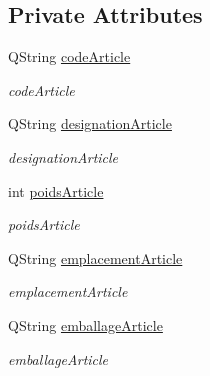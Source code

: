 \subsection*{Private Attributes}
\begin{DoxyCompactItemize}
\item 
\mbox{\label{class_article_a302186fb47a2b9bd8736bab99fe3ec75}} 
Q\+String \mbox{\hyperlink{class_article_a302186fb47a2b9bd8736bab99fe3ec75}{code\+Article}}
\begin{DoxyCompactList}\small\item\em code\+Article \end{DoxyCompactList}\item 
\mbox{\label{class_article_a120a68e558a25bfd50bcc0ace22d6eef}} 
Q\+String \mbox{\hyperlink{class_article_a120a68e558a25bfd50bcc0ace22d6eef}{designation\+Article}}
\begin{DoxyCompactList}\small\item\em designation\+Article \end{DoxyCompactList}\item 
\mbox{\label{class_article_aaf339d5933ee1e8386dd57a8f84a9602}} 
int \mbox{\hyperlink{class_article_aaf339d5933ee1e8386dd57a8f84a9602}{poids\+Article}}
\begin{DoxyCompactList}\small\item\em poids\+Article \end{DoxyCompactList}\item 
\mbox{\label{class_article_a97f4fcb1534dbe969fcb2f6f2a8fdbd7}} 
Q\+String \mbox{\hyperlink{class_article_a97f4fcb1534dbe969fcb2f6f2a8fdbd7}{emplacement\+Article}}
\begin{DoxyCompactList}\small\item\em emplacement\+Article \end{DoxyCompactList}\item 
\mbox{\label{class_article_a9ee6bb591aaba7535eac3d5965467965}} 
Q\+String \mbox{\hyperlink{class_article_a9ee6bb591aaba7535eac3d5965467965}{emballage\+Article}}
\begin{DoxyCompactList}\small\item\em emballage\+Article \end{DoxyCompactList}\end{DoxyCompactItemize}



